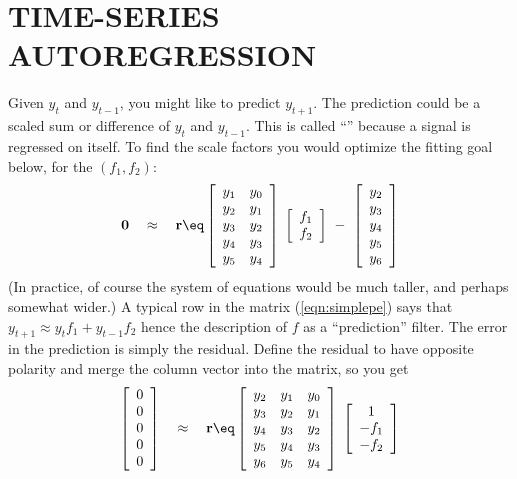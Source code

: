 \section{TIME-SERIES AUTOREGRESSION}
Given $y_t$ and $y_{t-1}$, you might like to predict $y_{t+1}$.
The prediction could be a scaled sum or difference
of $y_t$ and $y_{t-1}$.
This is called ``''
because a signal is regressed on itself.
To find the scale factors you would optimize the fitting goal below,
for the  $(f_1,f_2)$:
\begin{equation}
\bold 0
\quad \approx \quad
\bold r \eq
\left[ 
\begin{array}{ccc}
  y_1 & y_0 \\
  y_2 & y_1  \\
  y_3 & y_2  \\
  y_4 & y_3  \\
  y_5 & y_4  \end{array} \right] 
\; \left[ 
\begin{array}{c}
  f_1 \\ 
  f_2 \end{array} \right]
\ -\ 
\left[ 
\begin{array}{c}
  y_2 \\ 
  y_3 \\ 
  y_4 \\ 
  y_5 \\ 
  y_6 \end{array} \right] 
  \label{eqn:simplepe}
\end{equation}
(In practice, of course the system of equations would be
much taller, and perhaps somewhat wider.)
A typical row in the matrix (\ref{eqn:simplepe})
says that $y_{t+1} \approx y_t f_1 + y_{t-1} f_2$
hence the description of $f$ as a ``prediction'' filter.
The error in the prediction is simply the residual.
Define the residual to have opposite polarity
and merge the column vector into the matrix, so you get
\begin{equation}
\left[ 
\begin{array}{c}
  0 \\ 
  0 \\ 
  0 \\ 
  0 \\ 
  0 \end{array} \right] 
\quad \approx \quad
\bold r \eq
\left[ 
\begin{array}{ccc}
  y_2 & y_1 & y_0 \\
  y_3 & y_2 & y_1  \\
  y_4 & y_3 & y_2  \\
  y_5 & y_4 & y_3  \\
  y_6 & y_5 & y_4  \end{array} \right] 
\; \left[ 
\begin{array}{c}
  1 \\ 
  -f_1 \\ 
  -f_2 \end{array} \right]
  \label{eqn:simplepef}
\end{equation}
